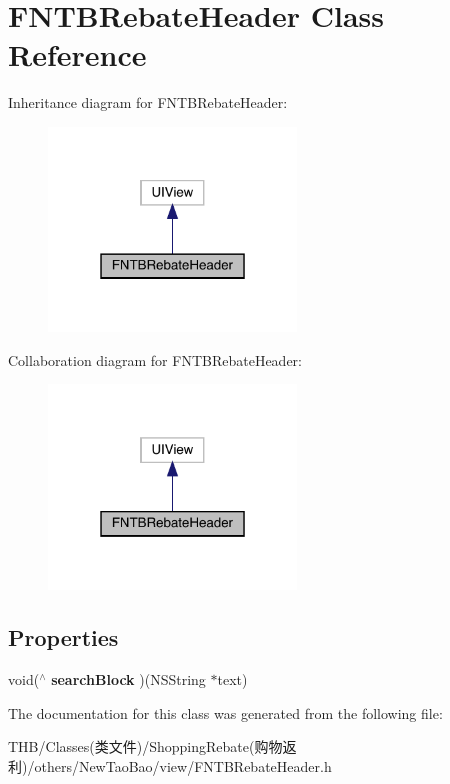 \hypertarget{interface_f_n_t_b_rebate_header}{}\section{F\+N\+T\+B\+Rebate\+Header Class Reference}
\label{interface_f_n_t_b_rebate_header}


Inheritance diagram for F\+N\+T\+B\+Rebate\+Header\+:\nopagebreak
\begin{figure}[H]
\begin{center}
\leavevmode
\includegraphics[width=187pt]{interface_f_n_t_b_rebate_header__inherit__graph}
\end{center}
\end{figure}


Collaboration diagram for F\+N\+T\+B\+Rebate\+Header\+:\nopagebreak
\begin{figure}[H]
\begin{center}
\leavevmode
\includegraphics[width=187pt]{interface_f_n_t_b_rebate_header__coll__graph}
\end{center}
\end{figure}
\subsection*{Properties}
\begin{DoxyCompactItemize}
\item 
\mbox{\label{interface_f_n_t_b_rebate_header_a90a6e940557edbe10a79280d7df5565f}} 
void($^\wedge$ {\bfseries search\+Block} )(N\+S\+String $\ast$text)
\end{DoxyCompactItemize}


The documentation for this class was generated from the following file\+:\begin{DoxyCompactItemize}
\item 
T\+H\+B/\+Classes(类文件)/\+Shopping\+Rebate(购物返利)/others/\+New\+Tao\+Bao/view/F\+N\+T\+B\+Rebate\+Header.\+h\end{DoxyCompactItemize}
